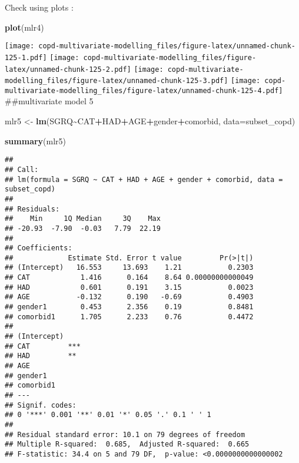 \documentclass[
]{article}
\newenvironment{Shaded}{\begin{snugshade}}{\end{snugshade}}
\newcommand{\AttributeTok}[1]{\textcolor[rgb]{0.13,0.29,0.53}{#1}}
\newcommand{\FunctionTok}[1]{\textcolor[rgb]{0.13,0.29,0.53}{\textbf{#1}}}
\newcommand{\NormalTok}[1]{#1}
\newcommand{\OtherTok}[1]{\textcolor[rgb]{0.56,0.35,0.01}{#1}}
\newcommand{\SpecialCharTok}[1]{\textcolor[rgb]{0.81,0.36,0.00}{\textbf{#1}}}
\begin{document}
Check using plots :

\begin{Shaded}
\begin{Highlighting}[]
\FunctionTok{plot}\NormalTok{(mlr4)}
\end{Highlighting}
\end{Shaded}

\texttt{[image: copd-multivariate-modelling\_files/figure-latex/unnamed-chunk-125-1.pdf]}
\texttt{[image: copd-multivariate-modelling\_files/figure-latex/unnamed-chunk-125-2.pdf]}
\texttt{[image: copd-multivariate-modelling\_files/figure-latex/unnamed-chunk-125-3.pdf]}
\texttt{[image: copd-multivariate-modelling\_files/figure-latex/unnamed-chunk-125-4.pdf]}
\#\#multivariate model 5

\begin{Shaded}
\begin{Highlighting}[]
\NormalTok{mlr5 }\OtherTok{\textless{}{-}} \FunctionTok{lm}\NormalTok{(SGRQ}\SpecialCharTok{\textasciitilde{}}\NormalTok{CAT}\SpecialCharTok{+}\NormalTok{HAD}\SpecialCharTok{+}\NormalTok{AGE}\SpecialCharTok{+}\NormalTok{gender}\SpecialCharTok{+}\NormalTok{comorbid, }\AttributeTok{data=}\NormalTok{subset\_copd)}
\end{Highlighting}
\end{Shaded}

\begin{Shaded}
\begin{Highlighting}[]
\FunctionTok{summary}\NormalTok{(mlr5)}
\end{Highlighting}
\end{Shaded}

\begin{verbatim}
## 
## Call:
## lm(formula = SGRQ ~ CAT + HAD + AGE + gender + comorbid, data = subset_copd)
## 
## Residuals:
##    Min     1Q Median     3Q    Max 
## -20.93  -7.90  -0.03   7.79  22.19 
## 
## Coefficients:
##             Estimate Std. Error t value         Pr(>|t|)
## (Intercept)   16.553     13.693    1.21           0.2303
## CAT            1.416      0.164    8.64 0.00000000000049
## HAD            0.601      0.191    3.15           0.0023
## AGE           -0.132      0.190   -0.69           0.4903
## gender1        0.453      2.356    0.19           0.8481
## comorbid1      1.705      2.233    0.76           0.4472
##                
## (Intercept)    
## CAT         ***
## HAD         ** 
## AGE            
## gender1        
## comorbid1      
## ---
## Signif. codes:  
## 0 '***' 0.001 '**' 0.01 '*' 0.05 '.' 0.1 ' ' 1
## 
## Residual standard error: 10.1 on 79 degrees of freedom
## Multiple R-squared:  0.685,  Adjusted R-squared:  0.665 
## F-statistic: 34.4 on 5 and 79 DF,  p-value: <0.0000000000000002
\end{verbatim}
\end{document}
